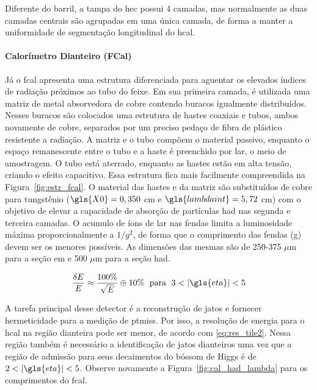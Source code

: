 Diferente do barril, a tampa do \gls{hec}
possui 4 camadas, mas normalmente as duas camadas centrais são agrupadas em uma
única camada, de forma a manter a uniformidade de segmentação longitudinal do
\gls{hcal}.

\paragraph{Calorímetro Dianteiro (FCal)}
\label{par:cal_fcal}

Já o \gls{fcal} apresenta uma estrutura diferenciada
para aguentar os elevados índices de radiação próximos ao tubo do feixe. Em sua primeira camada, 
é utilizada uma matriz de metal absorvedora de cobre contendo buracos igualmente
distribuídos. Nesses buracos são colocados uma estrutura de hastes coaxiais e tubos, 
ambos novamente de cobre, separados por um preciso pedaço de fibra de plástico resistente
a radiação. A matriz e o tubo compõem o material passivo,
enquanto o espaço remanescente entre o tubo e a haste é preenchido por \gls{lar},
o meio de amostragem. O tubo está aterrado, enquanto as hastes estão em alta tensão, 
criando o efeito capacitivo.
Essa estrutura fica mais facilmente compreendida na Figura~\ref{fig:estr_fcal}. 
O material das hastes e da matriz são substituídos de cobre para tungstênio
($\gls{X0} = 0,350$ cm e $\gls{lambdaint} = 5,72$ cm) com 
o objetivo de elevar a capacidade de absorção de partículas \gls{had} nas segunda 
e terceira camadas. O acumulo de íons de \gls{lar} nas fendas limita a
luminosidade máxima proporcionalmente a $1/g^2$, de forma que o comprimento das
fendas (g) devem ser os menores possíveis. 
As dimensões das mesmas são de 250-375 $\mu$m para a seção \gls{em} 
e 500 $\mu$m para a seção \gls{had}.

\begin{equation}\label{eq:res_tile2}
\frac{\delta E}{E} \approx \frac{100\%}{\sqrt{E}} \oplus 10\% \;\ \text{para} \;\
3<|\gls{eta}|<5
\end{equation}

A tarefa principal desse detector é a reconstrução de jatos e fornecer
hermeticidade para a medição de \gls{ptmiss}. Por isso, a resolução de energia para 
o \gls{hcal} na região dianteira pode ser menor, de
acordo com \ref{eq:res_tile2}. Nessa região também é necessário a identificação de
jatos dianteiros uma vez que a região de admissão para seus decaimentos do
bóssom de Higgs é de $2<|\gls{eta}|<5$. Observe novamente a
Figura~\ref{fig:cal_had_lambda} para os comprimentos do \gls{fcal}.


